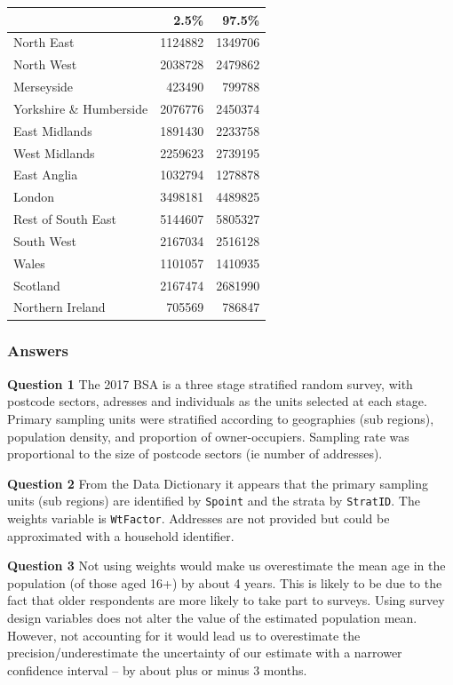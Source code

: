 \documentclass[
  14,
  a4paper,
  DIV=11,
  numbers=noendperiod]{scrartcl}
\begin{document}
\begin{tabular}{l|r|r}
\hline
  & 2.5\% & 97.5\%\\
\hline
North East & 1124882 & 1349706\\
\hline
North West & 2038728 & 2479862\\
\hline
Merseyside & 423490 & 799788\\
\hline
Yorkshire \& Humberside & 2076776 & 2450374\\
\hline
East Midlands & 1891430 & 2233758\\
\hline
West Midlands & 2259623 & 2739195\\
\hline
East Anglia & 1032794 & 1278878\\
\hline
London & 3498181 & 4489825\\
\hline
Rest of South East & 5144607 & 5805327\\
\hline
South West & 2167034 & 2516128\\
\hline
Wales & 1101057 & 1410935\\
\hline
Scotland & 2167474 & 2681990\\
\hline
Northern Ireland & 705569 & 786847\\
\hline
\end{tabular}

\hypertarget{answers}{%
\subsubsection{Answers}\label{answers}}

\textbf{Question 1} The 2017 BSA is a three stage stratified random
survey, with postcode sectors, adresses and individuals as the units
selected at each stage. Primary sampling units were stratified according
to geographies (sub regions), population density, and proportion of
owner-occupiers. Sampling rate was proportional to the size of postcode
sectors (ie number of addresses).

\textbf{Question 2} From the Data Dictionary it appears that the primary
sampling units (sub regions) are identified by \texttt{Spoint} and the
strata by \texttt{StratID}. The weights variable is \texttt{WtFactor}.
Addresses are not provided but could be approximated with a household
identifier.

\textbf{Question 3} Not using weights would make us overestimate the
mean age in the population (of those aged 16+) by about 4 years. This is
likely to be due to the fact that older respondents are more likely to
take part to surveys. Using survey design variables does not alter the
value of the estimated population mean. However, not accounting for it
would lead us to overestimate the precision/underestimate the
uncertainty of our estimate with a narrower confidence interval -- by
about plus or minus 3 months.
\end{document}
